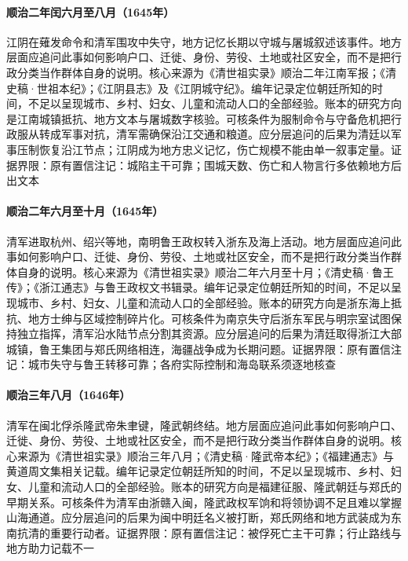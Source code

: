 \hypertarget{social:EQ-1645-JIANGYIN}{}\paragraph{顺治二年闰六月至八月（1645年）}江阴在薙发命令和清军围攻中失守，地方记忆长期以守城与屠城叙述该事件。地方层面应追问此事如何影响户口、迁徙、身份、劳役、土地或社区安全，而不是把行政分类当作群体自身的说明。核心来源为《清世祖实录》顺治二年江南军报；《清史稿·世祖本纪》；《江阴县志》及《江阴城守纪》。编年记录定位朝廷所知的时间，不足以呈现城市、乡村、妇女、儿童和流动人口的全部经验。账本的研究方向是江南城镇抵抗、地方文本与屠城数字核验。可核条件为服制命令与守备危机把行政服从转成军事对抗，清军需确保沿江交通和粮道。应分层追问的后果为清廷以军事压制恢复沿江节点；江阴成为地方忠义记忆，伤亡规模不能由单一叙事定量。证据界限：原有置信注记：城陷主干可靠；围城天数、伤亡和人物言行多依赖地方后出文本
\hypertarget{social:EQ-1645-ZHEJIANG-CONQUEST}{}\paragraph{顺治二年六月至十月（1645年）}清军进取杭州、绍兴等地，南明鲁王政权转入浙东及海上活动。地方层面应追问此事如何影响户口、迁徙、身份、劳役、土地或社区安全，而不是把行政分类当作群体自身的说明。核心来源为《清世祖实录》顺治二年六月至十月；《清史稿·鲁王传》；《浙江通志》与鲁王政权文书辑录。编年记录定位朝廷所知的时间，不足以呈现城市、乡村、妇女、儿童和流动人口的全部经验。账本的研究方向是浙东海上抵抗、地方士绅与区域控制碎片化。可核条件为南京失守后浙东军民与明宗室试图保持独立指挥，清军沿水陆节点分割其资源。应分层追问的后果为清廷取得浙江大部城镇，鲁王集团与郑氏网络相连，海疆战争成为长期问题。证据界限：原有置信注记：城市失守与鲁王转移可靠；各府实际控制和海岛联系须逐地核查
\hypertarget{social:EQ-1646-LONGWU-CAPTURE}{}\paragraph{顺治三年八月（1646年）}清军在闽北俘杀隆武帝朱聿键，隆武朝终结。地方层面应追问此事如何影响户口、迁徙、身份、劳役、土地或社区安全，而不是把行政分类当作群体自身的说明。核心来源为《清世祖实录》顺治三年八月；《清史稿·隆武帝本纪》；《福建通志》与黄道周文集相关记载。编年记录定位朝廷所知的时间，不足以呈现城市、乡村、妇女、儿童和流动人口的全部经验。账本的研究方向是福建征服、隆武朝廷与郑氏的早期关系。可核条件为清军由浙赣入闽，隆武政权军饷和将领协调不足且难以掌握山海通道。应分层追问的后果为闽中明廷名义被打断，郑氏网络和地方武装成为东南抗清的重要行动者。证据界限：原有置信注记：被俘死亡主干可靠；行止路线与地方助力记载不一
